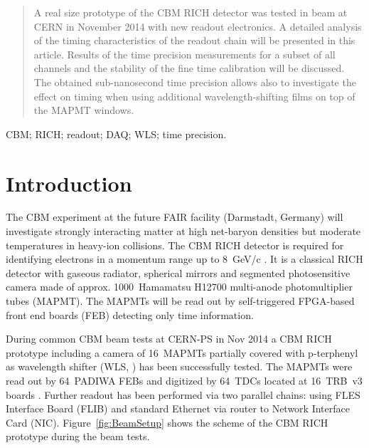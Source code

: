 \documentclass[final,5p,times,twocolumn]{elsarticle}
\begin{document}
\begin{frontmatter}

\begin{abstract}
A real size prototype of the CBM RICH detector was tested in beam at CERN in November 2014 with new readout electronics. A detailed analysis of the timing characteristics of the readout chain  will be presented in this article. Results of the time precision measurements for a subset of all channels and the stability of the fine time calibration will be discussed. The obtained sub-nanosecond time precision allows also to investigate the effect on timing when using additional wavelength-shifting films on top of the MAPMT windows.
\end{abstract}

\begin{keyword}
CBM; RICH; readout; DAQ; WLS; time precision.
\end{keyword}

\end{frontmatter}


\section{Introduction}

The CBM experiment at the future FAIR facility (Darmstadt, Germany) will investigate strongly interacting matter at high net-baryon densities but moderate temperatures in heavy-ion collisions. The CBM RICH detector is required for identifying electrons in a momentum range up to 8~GeV/c \cite{CBMRICH1, CBMRICH2, CBMRICHPROJECT}. It is a classical RICH detector with gaseous radiator, spherical mirrors and segmented photosensitive camera made of approx. 1000~Hamamatsu H12700 multi-anode photomultiplier tubes (MAPMT). The MAPMTs will be read out by self-triggered FPGA-based front end boards (FEB) detecting only time information.

During common CBM beam tests at CERN-PS in Nov 2014 a CBM RICH prototype including a camera of 16~MAPMTs partially covered with p-terphenyl as wavelength shifter (WLS, \cite{WLS}) has been successfully tested. The MAPMTs were read out by 64~PADIWA FEBs and digitized by 64~TDCs located at 16~TRB~v3 boards \cite{TRB}. Further readout has been performed via two parallel chains: using FLES \cite{FLES} Interface Board (FLIB) and standard Ethernet via router to Network Interface Card (NIC). Figure~\ref{fig:BeamSetup} shows the scheme of the CBM RICH prototype during the beam tests.
\end{document}
